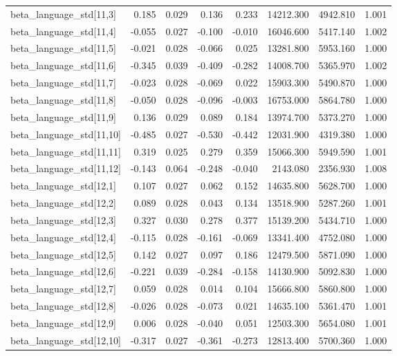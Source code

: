 \begin{tabular}{lrrrrrrr}
beta\_language\_std[11,3] & 0.185 & 0.029 & 0.136 & 0.233 & 14212.300 & 4942.810 & 1.001 \\
beta\_language\_std[11,4] & -0.055 & 0.027 & -0.100 & -0.010 & 16046.600 & 5417.140 & 1.002 \\
beta\_language\_std[11,5] & -0.021 & 0.028 & -0.066 & 0.025 & 13281.800 & 5953.160 & 1.000 \\
beta\_language\_std[11,6] & -0.345 & 0.039 & -0.409 & -0.282 & 14008.700 & 5365.970 & 1.002 \\
beta\_language\_std[11,7] & -0.023 & 0.028 & -0.069 & 0.022 & 15903.300 & 5490.870 & 1.000 \\
beta\_language\_std[11,8] & -0.050 & 0.028 & -0.096 & -0.003 & 16753.000 & 5864.780 & 1.000 \\
beta\_language\_std[11,9] & 0.136 & 0.029 & 0.089 & 0.184 & 13974.700 & 5373.270 & 1.000 \\
beta\_language\_std[11,10] & -0.485 & 0.027 & -0.530 & -0.442 & 12031.900 & 4319.380 & 1.000 \\
beta\_language\_std[11,11] & 0.319 & 0.025 & 0.279 & 0.359 & 15066.300 & 5949.590 & 1.001 \\
beta\_language\_std[11,12] & -0.143 & 0.064 & -0.248 & -0.040 & 2143.080 & 2356.930 & 1.008 \\
beta\_language\_std[12,1] & 0.107 & 0.027 & 0.062 & 0.152 & 14635.800 & 5628.700 & 1.000 \\
beta\_language\_std[12,2] & 0.089 & 0.028 & 0.043 & 0.134 & 13518.900 & 5287.260 & 1.001 \\
beta\_language\_std[12,3] & 0.327 & 0.030 & 0.278 & 0.377 & 15139.200 & 5434.710 & 1.000 \\
beta\_language\_std[12,4] & -0.115 & 0.028 & -0.161 & -0.069 & 13341.400 & 4752.080 & 1.000 \\
beta\_language\_std[12,5] & 0.142 & 0.027 & 0.097 & 0.186 & 12479.500 & 5871.090 & 1.000 \\
beta\_language\_std[12,6] & -0.221 & 0.039 & -0.284 & -0.158 & 14130.900 & 5092.830 & 1.000 \\
beta\_language\_std[12,7] & 0.059 & 0.028 & 0.014 & 0.104 & 15666.800 & 5860.800 & 1.000 \\
beta\_language\_std[12,8] & -0.026 & 0.028 & -0.073 & 0.021 & 14635.100 & 5361.470 & 1.001 \\
beta\_language\_std[12,9] & 0.006 & 0.028 & -0.040 & 0.051 & 12503.300 & 5654.080 & 1.001 \\
beta\_language\_std[12,10] & -0.317 & 0.027 & -0.361 & -0.273 & 12813.400 & 5700.360 & 1.000 \\

\end{tabular}
